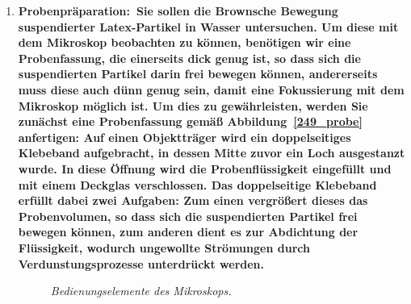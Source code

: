\documentclass{../papanleitung}
\begin{document}
\begin{enumerate}
    \item
\bf Probenpr\"{a}paration:\rm~Sie sollen die Brownsche Bewegung
suspendierter Latex-Partikel in Wasser untersuchen. Um diese mit
dem Mikroskop beobachten zu k\"{o}nnen, ben\"{o}tigen wir eine
Probenfassung, die einerseits dick genug ist, so dass sich die
suspendierten Partikel darin frei bewegen k\"{o}nnen, andererseits
muss diese auch d\"{u}nn genug sein, damit eine Fokussierung mit dem
Mikroskop m\"{o}glich ist. Um dies zu gew\"{a}hrleisten, werden Sie
zun\"{a}chst eine Probenfassung gem\"{a}{\ss} Abbildung~\ref{249_probe}
anfertigen: Auf einen Objekttr\"{a}ger wird ein doppelseitiges
Klebeband aufgebracht, in dessen Mitte zuvor ein Loch ausgestanzt
wurde. In diese \"{O}ffnung wird die Probenfl\"{u}ssigkeit eingef\"{u}llt und
mit einem Deckglas verschlossen.  Das doppelseitige Klebeband
erf\"{u}llt dabei zwei Aufgaben: Zum einen vergr\"{o}{\ss}ert dieses das
Probenvolumen, so dass sich die suspendierten Partikel frei
bewegen k\"{o}nnen, zum anderen dient es zur Abdichtung der
Fl\"{u}ssigkeit, wodurch ungewollte Str\"{o}mungen durch
Verdunstungsprozesse unterdr\"{u}ckt werden.

\begin{figure}
\begin{minipage}[c]{12cm}
\centering{}
\caption{\label{249_Mikroskop}\fontsize{10}{12}\it
Bedienungselemente des Mikroskops.}
\end{minipage}
\end{figure}



\end{enumerate}
\end{document}
